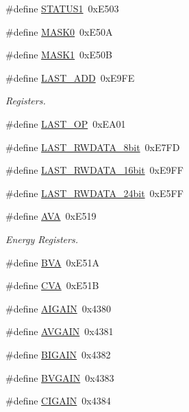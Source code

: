 \begin{DoxyCompactItemize}
\item 
\#define \hyperlink{a00036_aa6aa3353326411951938073499579582}{S\-T\-A\-T\-U\-S1}~0x\-E503
\item 
\#define \hyperlink{a00036_ac1d7c440cf3cf403bbc1879f86bba211}{M\-A\-S\-K0}~0x\-E50\-A
\item 
\#define \hyperlink{a00036_a84bd6e5737d6e76532842829faeb2b07}{M\-A\-S\-K1}~0x\-E50\-B
\item 
\#define \hyperlink{a00036_adab6c053c389db762442c88b7e32e543}{L\-A\-S\-T\-\_\-\-A\-D\-D}~0x\-E9\-F\-E
\begin{DoxyCompactList}\small\item\em Registers. \end{DoxyCompactList}\item 
\#define \hyperlink{a00036_aed1301248abf6c26045727a190f6550a}{L\-A\-S\-T\-\_\-\-O\-P}~0x\-E\-A01
\item 
\#define \hyperlink{a00036_aaa92568580634eb4d7142a90ffc296ad}{L\-A\-S\-T\-\_\-\-R\-W\-D\-A\-T\-A\-\_\-8bit}~0x\-E7\-F\-D
\item 
\#define \hyperlink{a00036_a99f0c5464504ec1c928ef08f8089436b}{L\-A\-S\-T\-\_\-\-R\-W\-D\-A\-T\-A\-\_\-16bit}~0x\-E9\-F\-F
\item 
\#define \hyperlink{a00036_a1a1766ab426d88553f65298497d636fc}{L\-A\-S\-T\-\_\-\-R\-W\-D\-A\-T\-A\-\_\-24bit}~0x\-E5\-F\-F
\item 
\#define \hyperlink{a00036_ae7cdec48ca69414825f989d1e54ac75e}{A\-V\-A}~0x\-E519
\begin{DoxyCompactList}\small\item\em Energy Registers. \end{DoxyCompactList}\item 
\#define \hyperlink{a00036_a19e30da5f33e53c72352f8d8bf7f820a}{B\-V\-A}~0x\-E51\-A
\item 
\#define \hyperlink{a00036_ac1b321e92c8fb61be50f9cc733df7aaf}{C\-V\-A}~0x\-E51\-B
\item 
\#define \hyperlink{a00036_a8a19559f0146d0aa49b05556cde296e4}{A\-I\-G\-A\-I\-N}~0x4380
\item 
\#define \hyperlink{a00036_a71e3b41bc58cad314fbc2d9739265921}{A\-V\-G\-A\-I\-N}~0x4381
\item 
\#define \hyperlink{a00036_aa4b9cf5a0254b722e1d78f7b6fb357b9}{B\-I\-G\-A\-I\-N}~0x4382
\item 
\#define \hyperlink{a00036_a9a9d28eb690ced7dfa1e126448b167e3}{B\-V\-G\-A\-I\-N}~0x4383
\item 
\#define \hyperlink{a00036_aba22a31e9d3b49ddd019cf6b3e819251}{C\-I\-G\-A\-I\-N}~0x4384

\end{DoxyCompactItemize}
